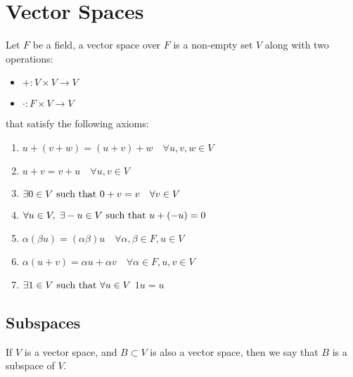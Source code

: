 \section{Vector Spaces}

Let $F$ be a field, a vector space over $F$ is a non-empty set $V$ along with two operations:

\begin{itemize}
    \item $+: V \times V \to V$
    \item $\cdot: F \times V \to V$
\end{itemize}

that satisfy the following axioms:

\begin{enumerate}
    \item $u + (v + w) = (u + v) + w \quad \forall u, v, w \in V$
    \item $u + v = v + u \quad \forall u, v \in V$
    \item $\exists 0 \in V \text{ such that } 0 + v = v \quad \forall v \in V$
    \item $\forall u \in V ,\; \exists -u \in V \text{ such that } u + (-u) = 0$
    \item $\alpha(\beta u) = (\alpha \beta) u \quad \forall \alpha, \beta \in F, u \in V$
    \item $\alpha (u + v) = \alpha u + \alpha v \quad \forall \alpha \in F, u, v \in V$
    \item $\exists 1 \in V \text{ such that } \forall u \in V $ $ 1u = u$
\end{enumerate}


\subsection{Subspaces}
If $V$ is a vector space, and $B \subset V$ is also a vector space, then we say that $B$ is a subspace of $V$.

